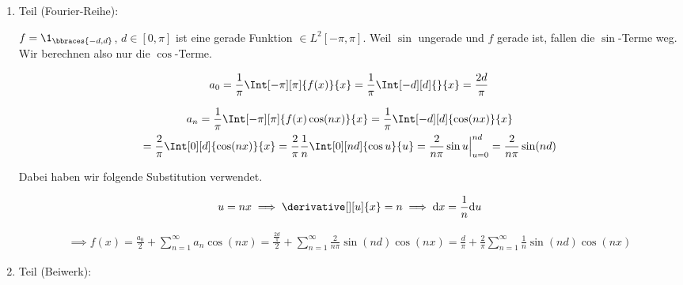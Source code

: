 \begin{solution}

\phantom{}

\begin{enumerate}[label = \arabic*.]

    \item Teil (Fourier-Reihe):

    $f = \1_\bbraces{-d, d}$, $d \in [0, \pi]$ ist eine gerade Funktion $\in L^2[-\pi, \pi]$.
    Weil $\sin$ ungerade und $f$ gerade ist, fallen die $\sin$-Terme weg.
    Wir berechnen also nur die $\cos$-Terme.
    
    \begin{align*}
        a_0
        =
        \frac{1}{\pi}
        \Int[-\pi][\pi]{f(x)}{x}
        =
        \frac{1}{\pi}
        \Int[-d][d]{}{x}
        =
        \frac{2 d}{\pi}
    \end{align*}
    
    \begin{multline*}
        a_n
        =
        \frac{1}{\pi}
        \Int[-\pi][\pi]{f(x) \cos(n x)}{x}
        =
        \frac{1}{\pi}
        \Int[-d][d]{\cos(n x)}{x} \\
        =
        \frac{2}{\pi}
        \Int[0][d]{\cos(n x)}{x}
        =
        \frac{2}{\pi}
        \frac{1}{n}
        \Int[0][n d]{\cos u}{u}
        =
        \frac{2}{n \pi}
        \sin u \Big |_{u=0}^{n d}
        =
        \frac{2}{n \pi}
        \sin(n d)
    \end{multline*}
    
    Dabei haben wir folgende Substitution verwendet.
    
    \begin{align*}
        u = n x
        \implies
        \derivative[][u]{x} = n
        \implies
        \mathrm{d} x = \frac{1}{n} \mathrm{d} u
    \end{align*}
    
    \begin{align*}
        \implies
        f(x)
        =
        \frac{a_0}{2}
        +
        \sum_{n=1}^\infty
        a_n \cos(n x)
        =
        \frac
        {
            \frac{2 d}{\pi}
        }{2}
        +
        \sum_{n=1}^\infty
        \frac{2}{n \pi}
        \sin(n d)
        \cos(n x)
        =
        \frac{d}{\pi}
        +
        \frac{2}{\pi}
        \sum_{n=1}^\infty
        \frac{1}{n}
        \sin(n d)
        \cos(n x)    
    \end{align*}
    
    \item Teil (Beiwerk):


\end{enumerate}
\end{solution}
